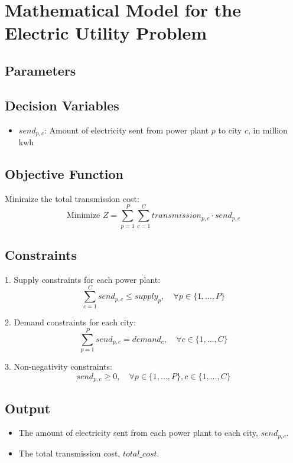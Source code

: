 \documentclass{article}
\begin{document}
\section*{Mathematical Model for the Electric Utility Problem}

\subsection*{Parameters}

\subsection*{Decision Variables}
\begin{itemize}
    \item $send_{p,c}$: Amount of electricity sent from power plant $p$ to city $c$, in million kwh
\end{itemize}

\subsection*{Objective Function}
Minimize the total transmission cost:
\[
\text{Minimize } Z = \sum_{p=1}^{P} \sum_{c=1}^{C} transmission_{p,c} \cdot send_{p,c}
\]

\subsection*{Constraints}
1. Supply constraints for each power plant:
\[
\sum_{c=1}^{C} send_{p,c} \leq supply_{p}, \quad \forall p \in \{1, \ldots, P\}
\]

2. Demand constraints for each city:
\[
\sum_{p=1}^{P} send_{p,c} = demand_{c}, \quad \forall c \in \{1, \ldots, C\}
\]

3. Non-negativity constraints:
\[
send_{p,c} \geq 0, \quad \forall p \in \{1, \ldots, P\}, c \in \{1, \ldots, C\}
\]

\subsection*{Output}
\begin{itemize}
    \item The amount of electricity sent from each power plant to each city, $send_{p,c}$.
    \item The total transmission cost, $total\_cost$.
\end{itemize}
\end{document}
